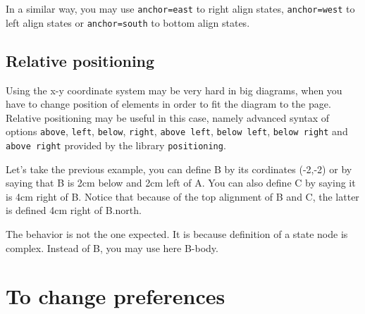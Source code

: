\documentclass[a4paper,11pt]{report}
\begin{document}
In a similar way, you may use {\tt anchor=east} to right align states, {\tt anchor=west} to left align states or {\tt anchor=south} to bottom align states.

\subsection{Relative positioning}\label{ss.ucdiagrelpos}

Using the x-y coordinate system may be very hard in big diagrams, when you have to change position of elements in order to fit the diagram to the page. Relative positioning may be useful in this case, namely advanced syntax of options {\tt above}, {\tt left}, {\tt below}, {\tt right}, {\tt above left}, {\tt below left}, {\tt below right} and {\tt above right} provided by the \TikZ library {\tt positioning}.

\medskip

Let's take the previous example, you can define B by its cordinates (-2,-2) or by saying that B is 2cm below and 2cm left of A. You can also define C by saying it is 4cm right of B. Notice that because of the top alignment of B and C, the latter is defined 4cm right of B.north.

\medskip

\begin{minipage}{0.5\textwidth}

\end{minipage}
\begin{minipage}{0.5\textwidth}
\begin{center}
\end{center}
\end{minipage}

\medskip

The behavior is not the one expected. It is because definition of a state node is complex. Instead of B, you may use here B-body.

\begin{minipage}{0.5\textwidth}

\end{minipage}
\begin{minipage}{0.5\textwidth}
\begin{center}
\end{center}
\end{minipage}

\medskip

\section{To change preferences}\label{s.fitstatetrans}
\end{document}
